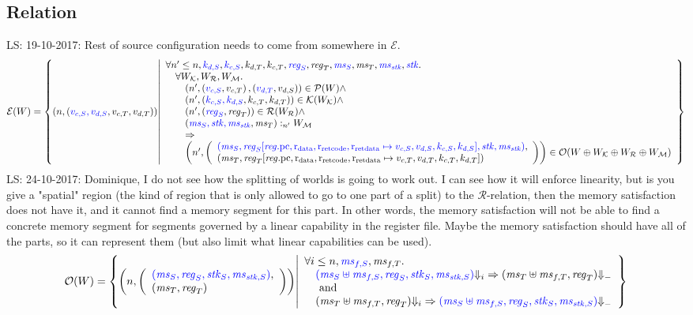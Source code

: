 \documentclass[a3paper]{article}
\newcommand\lau[1]{{\color{purple} \sf \footnotesize {LS: #1}}\\}
\newcommand{\npair}[2][n]{\left(#1,#2\right)}
\newcommand{\tand}{\text{ and }}
\newcommand{\typesetlr}[1]{\mathcal{#1}}
\newcommand{\lre}{\typesetlr{E}}
\newcommand{\lrk}{\typesetlr{K}}
\newcommand{\lrr}{\typesetlr{R}}
\newcommand{\lro}{\typesetlr{O}}
\newcommand{\lrp}{\typesetlr{P}}
\newcommand{\lrm}{\typesetlr{M}}
\newcommand{\stpair}[3][]{
\ifthenelse{\equal{#1}{}}
{\left(\src{#2_S},#3_T\right)}
{\left(\src{#2},#3\right)}}
\newcommand{\memSat}[3][n]{#2 :_{#1}#3}
\newcommand{\sourcecolor}{\color{blue}}
\newcommand{\src}[1]{{\sourcecolor #1}}
\newcommand{\update}[2]{[#1 \mapsto #2]}
\newcommand{\updReg}[2]{\update{\reg.#1}{#2}}
\newcommand{\term}[1][-]{{\Downarrow_{#1}}}
\newcommand{\var}[1]{\mathit{#1}}
\newcommand{\reg}{\var{reg}}
\newcommand{\ms}{\var{ms}}
\newcommand{\stk}{\var{stk}}
\newcommand{\pcreg}{\mathrm{pc}}
\newcommand{\rretc}{\mathrm{r}_\mathrm{ret code}}
\newcommand{\rretd}{\mathrm{r}_\mathrm{ret data}}
\newcommand{\rdata}{\mathrm{r}_\mathrm{data}}
\begin{document}
\subsection{Relation}
\lau{19-10-2017: Rest of source configuration needs to come from somewhere in $\lre$.}
\[
  \lre(W) = \left\{ \npair{\stpair[.]{v_{c,S},v_{d,S}}{v_{c,T},v_{d,T}}} \middle| 
    \begin{array}{l}
      \forall n' \leq n, \src{k_{d,S}}, \src{k_{c,S}}, k_{d,T}, k_{c,T}, \src{\reg_S}, \reg_T, \src{\ms_S}, \ms_T, \src{\ms_\stk}, \src{\stk} \ldotp\\
      \quad \forall W_\lrk, W_\lrr, W_\lrm \ldotp \\
      \qquad\npair[n']{\stpair[.]{v_{c,S}}{v_{c,T}},\stpair[.]{v_{d,T}}{v_{d,S}}} \in \lrp(W) \wedge \\
      \qquad\npair[n']{\stpair[.]{k_{c,S},k_{d,S}}{k_{c,T},k_{d,T}}} \in \lrk(W_\lrk) \wedge \\
      \qquad\npair[n']{\stpair{\reg}{\reg}} \in \lrr(W_\lrr) \wedge\\
      \qquad\memSat[n']{\stpair[.]{\ms_S,\stk,\ms_\stk}{\ms_T}}{W_\lrm} \\
      \qquad\Rightarrow\\
      \qquad\npair[n']{\left(\array{l}\src{(\ms_S,\reg_S\updReg{\pcreg,\rdata,\rretc,\rretd}{v_{c,S},v_{d,S},k_{c,S},k_{d,S}},\stk, \ms_\stk)},\\
                                          (\ms_T,\reg_T\updReg{\pcreg,\rdata,\rretc,\rretd}{v_{c,T},v_{d
,T},k_{c,T},k_{d,T}})\endarray\right)}
      \in \lro(W\oplus W_\lrk \oplus W_\lrr \oplus W_\lrm)
    \end{array}
    \right\}
\]
\lau{24-10-2017: Dominique, I do not see how the splitting of worlds is going to work out. I can see how it will enforce linearity, but is you give a "spatial" region (the kind of region that is only allowed to go to one part of a split) to the $\lrr$-relation, then the memory satisfaction does not have it, and it cannot find a memory segment for this part. In other words, the memory satisfaction will not be able to find a concrete memory segment for segments governed by a linear capability in the register file. Maybe the memory satisfaction should have all of the parts, so it can represent them (but also limit what linear capabilities can be used).}

\[
  \lro(W) = \left\{ \npair{\left(\array{l}\src{(\ms_S,\reg_S,\stk_S,\ms_{\stk,S})},\\(\ms_T,\reg_T)\endarray\right)} \middle|
    \begin{array}{l}
      \forall i \leq n, \src{\ms_{f,S}}, \ms_{f,T} \ldotp \\
      \quad \src{(\ms_S \uplus \ms_{f,S},\reg_S,\stk_S,\ms_{\stk,S})} \term[i] \Rightarrow (\ms_T \uplus \ms_{f,T},\reg_T) \term\\
      \quad \tand\\
      \quad (\ms_T \uplus \ms_{f,T},\reg_T) \term[i] \Rightarrow \src{(\ms_S \uplus \ms_{f,S},\reg_S,\stk_S,\ms_{\stk,S})} \term
    \end{array}
\right\}
\]
\end{document}
